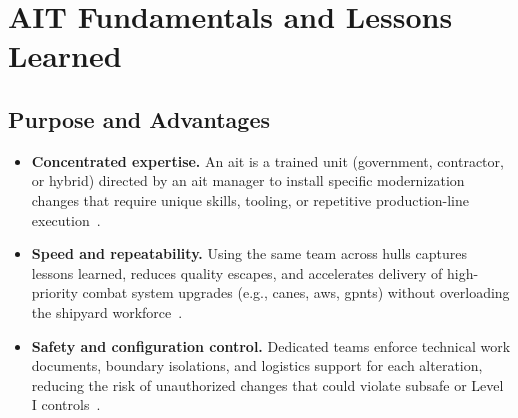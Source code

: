 \documentclass[../main.tex]{subfiles}
\begin{document}
\section{AIT Fundamentals and Lessons Learned}

\subsection{Purpose and Advantages}
\begin{itemize}
  \item \textbf{Concentrated expertise.} An \ac{ait} is a trained unit (government, contractor, or hybrid) directed by an \ac{ait} manager to install specific modernization changes that require unique skills, tooling, or repetitive production-line execution~\autocite{TS9090-310,edo-4-1-4-ait-fundamentals-2025}.
  \item \textbf{Speed and repeatability.} Using the same team across hulls captures lessons learned, reduces quality escapes, and accelerates delivery of high-priority combat system upgrades (e.g., \ac{canes}, \ac{aws}, \ac{gpnts}) without overloading the shipyard workforce~\autocite{SL720-AA-MAN-030}.
  \item \textbf{Safety and configuration control.} Dedicated teams enforce technical work documents, boundary isolations, and logistics support for each alteration, reducing the risk of unauthorized changes that could violate \ac{subsafe} or Level I controls~\autocite{TS9090-310}.
\end{itemize}
\end{document}
